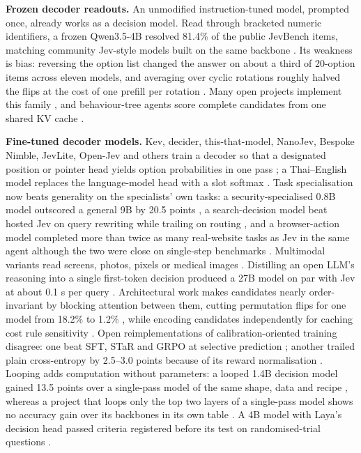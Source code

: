\textbf{Frozen decoder readouts.} An unmodified instruction-tuned model, prompted once, already works as a decision model. Read through bracketed numeric identifiers, a frozen Qwen3.5-4B resolved 81.4\% of the public JevBench items, matching community Jev-style models built on the same backbone \citep{arxiv2610_02076}. Its weakness is bias: reversing the option list changed the answer on about a third of 20-option items across eleven models, and averaging over cyclic rotations roughly halved the flips at the cost of one prefill per rotation \citep{arxiv2610_00831}. Many open projects implement this family \citep{gh_theoleecj_semif,gh_yinsongxu_llm2jev,gh_featherless_ai_simple_jev,gh_zhengxuyu_litjev}, and behaviour-tree agents score complete candidates from one shared KV cache \citep{arxiv2610_07327}.

\textbf{Fine-tuned decoder models.} Kev, decider, this-that-model, NanoJev, Bespoke Nimble, JevLite, Open-Jev and others train a decoder so that a designated position or pointer head yields option probabilities in one pass \citep{gh_jaredpalmer_kev,gh_mapika_decider,arxiv2609_23886,gh_tianyucodings_nanojev,gh_bespokelabsai_nimble,arxiv2609_23959,gh_zefan_cai_open_jev}; a Thai–English model replaces the language-model head with a slot softmax \citep{gh_iapp_technology_openthai_systemone}. Task specialisation now beats generality on the specialists' own tasks: a security-specialised 0.8B model outscored a general 9B by 20.5 points \citep{arxiv2610_03073}, a search-decision model beat hosted Jev on query rewriting while trailing on routing \citep{arxiv2610_05107}, and a browser-action model completed more than twice as many real-website tasks as Jev in the same agent although the two were close on single-step benchmarks \citep{gh_lexmount_webjev}. Multimodal variants read screens, photos, pixels or medical images \citep{arxiv2609_25845,gh_omnijev_onejev,gh_omnijev_playjev,arxiv2610_00381}. Distilling an open LLM's reasoning into a single first-token decision produced a 27B model on par with Jev at about 0.1 s per query \citep{arxiv2610_03935}. Architectural work makes candidates nearly order-invariant by blocking attention between them, cutting permutation flips for one model from 18.2\% to 1.2\% \citep{arxiv2610_01601}, while encoding candidates independently for caching cost rule sensitivity \citep{arxiv2609_37832}. Open reimplementations of calibration-oriented training disagree: one beat SFT, STaR and GRPO at selective prediction \citep{arxiv2609_38850}; another trailed plain cross-entropy by 2.5–3.0 points because of its reward normalisation \citep{arxiv2610_02486}. Looping adds computation without parameters: a looped 1.4B decision model gained 13.5 points over a single-pass model of the same shape, data and recipe \citep{arxiv2610_07730}, whereas a project that loops only the top two layers of a single-pass model shows no accuracy gain over its backbones in its own table \citep{gh_gitchw_lct}. A 4B model with Laya's decision head passed criteria registered before its test on randomised-trial questions \citep{arxiv2610_07019}.

